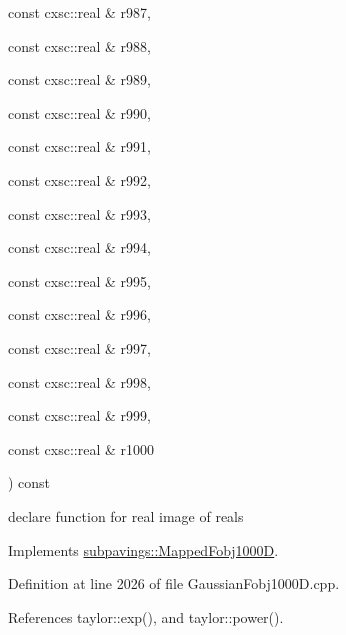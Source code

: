 {{\begin{DoxyParamCaption}
\item[{const cxsc\-::real \&}]{r987, }
\item[{const cxsc\-::real \&}]{r988, }
\item[{const cxsc\-::real \&}]{r989, }
\item[{const cxsc\-::real \&}]{r990, }
\item[{const cxsc\-::real \&}]{r991, }
\item[{const cxsc\-::real \&}]{r992, }
\item[{const cxsc\-::real \&}]{r993, }
\item[{const cxsc\-::real \&}]{r994, }
\item[{const cxsc\-::real \&}]{r995, }
\item[{const cxsc\-::real \&}]{r996, }
\item[{const cxsc\-::real \&}]{r997, }
\item[{const cxsc\-::real \&}]{r998, }
\item[{const cxsc\-::real \&}]{r999, }
\item[{const cxsc\-::real \&}]{r1000}
\end{DoxyParamCaption}
) const}}\label{classGaussianFobj1000D_ab8de306d468364bc26813512d37c1e3a}


declare function for real image of reals 



\-Implements \hyperlink{classsubpavings_1_1MappedFobj1000D_a3f1bac6f34725fcfb6c231bee7bede58}{subpavings\-::\-Mapped\-Fobj1000\-D}.



\-Definition at line 2026 of file \-Gaussian\-Fobj1000\-D.\-cpp.



\-References taylor\-::exp(), and taylor\-::power().


